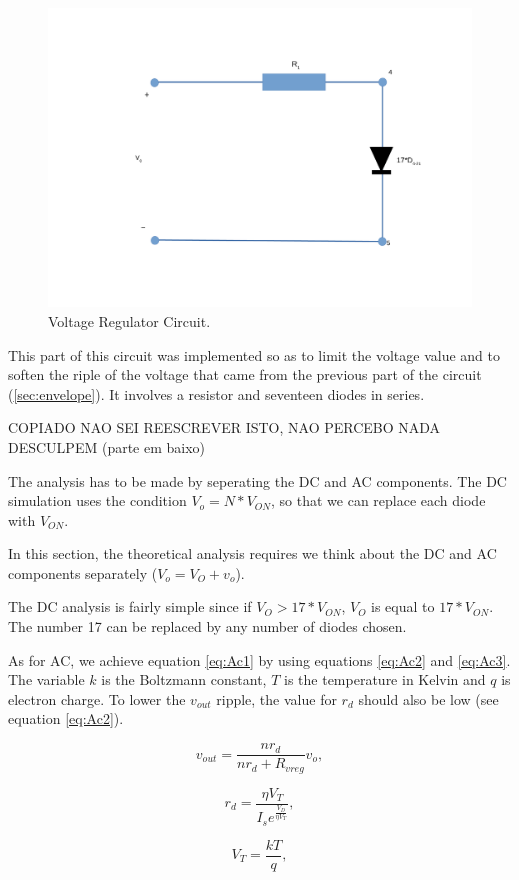 \begin{figure}[h]
    \centering
    \includegraphics[scale=0.5]{voltageregulator.pdf}
    \caption{Voltage Regulator Circuit.}
    \label{fig:Regulator}
\end{figure}

This part of this circuit was implemented so as to limit the voltage value and to soften the riple of the voltage that came from the previous part of the circuit (\ref{sec:envelope}). It involves a resistor and seventeen diodes in series.

COPIADO NAO SEI REESCREVER ISTO, NAO PERCEBO NADA DESCULPEM  (parte em baixo)

The analysis has to be made by seperating the DC and AC components. The DC simulation uses the condition $V_o=N * V_{ON}$, so that we can replace each diode with $V_{ON}$. 

In this section, the theoretical analysis requires we think about the DC and AC components separately ($V_o=V_O+v_o$). 

The DC analysis is fairly simple since if $V_O>17*V_{ON}$, $V_O$ is equal to $17*V_{ON}$. The number 17 can be replaced by any number of diodes chosen. 

As for AC, we achieve equation \ref{eq:Ac1} by using equations \ref{eq:Ac2} and \ref{eq:Ac3}. The variable $k$ is the Boltzmann constant, $T$ is the temperature in Kelvin and $q$ is electron charge. To lower the $v_{out}$ ripple, the value for $r_d$ should also be low (see equation \ref{eq:Ac2}).

\begin{equation}
    v_{out}=\frac{n r_{d}}{n r_{d} + R_{vreg}}v_o,
    \label{eq:Ac1}
\end{equation}

\begin{equation}
    r_{d}=\frac{\eta V_T}{I_s e^{\frac{V_D}{\eta V_T}}},
    \label{eq:Ac2}
\end{equation}

\begin{equation}
    V_{T} = \frac{kT}{q},
    \label{eq:Ac3}
\end{equation}

\newpage 

\newpage 




